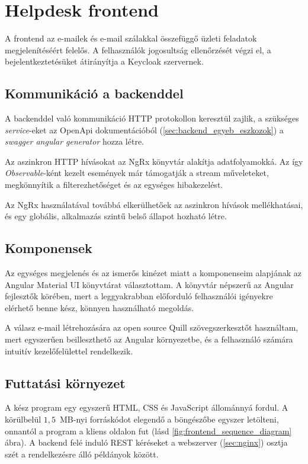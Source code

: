 \section{Helpdesk frontend}
A frontend az e-mailek és e-mail szálakkal összefüggő üzleti feladatok megjelenítéséért felelős. A felhasználók jogosultság ellenőrzését végzi el, a bejelentkeztetésüket átirányítja a Keycloak szervernek. 


\subsection{Kommunikáció a backenddel}
A backenddel való kommunikáció HTTP protokollon keresztül zajlik, a szükséges \textit{service}-eket az OpenApi dokumentációból (\ref{sec:backend_egyeb_eszkozok}) a \textit{swagger angular generator} hozza létre.

Az aszinkron HTTP hívásokat az NgRx könyvtár alakítja adatfolyamokká. 
Az így \textit{Observable}-ként kezelt események már támogatják a stream műveleteket, megkönnyítik a filterezhetőséget és az egységes hibakezelést. 

Az NgRx használatával továbbá elkerülhetőek az aszinkron hívások mellékhatásai, és egy globális, alkalmazás szintű belső állapot hozható létre.

\subsection{Komponensek}
Az egységes megjelenés és az ismerős kinézet miatt a komponenseim alapjának az Angular Material UI könyvtárat választottam. A könyvtár népszerű az Angular fejlesztők körében, mert a leggyakrabban előforduló felhasználói igényekre elérhető benne kész, könnyen használható megoldás.

A válasz e-mail létrehozására az open source Quill szövegszerkesztőt használtam, mert egyszerűen beilleszthető az Angular környezetbe, és a felhasználó számára intuitív kezelőfelülettel rendelkezik.


\subsection{Futtatási környezet}
A kész program egy egyszerű HTML, CSS és JavaScript állománnyá fordul. A körülbelül $1,5$~MB-nyi forráskódot elegendő a böngészőbe egyszer letölteni, onnantól a program a kliens oldalon fut (lásd \ref{fig:frontend_sequence_diagram} ábra). A backend felé induló REST kéréseket a webszerver (\ref{sec:nginx}) osztja szét a rendelkezésre álló példányok között.

